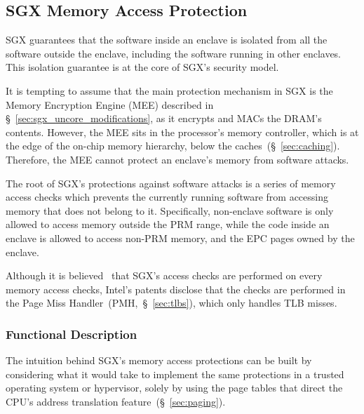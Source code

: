 \subsection{SGX Memory Access Protection}
\label{sec:sgx_access_protection}

SGX guarantees that the software inside an enclave is isolated from all the
software outside the enclave, including the software running in other enclaves.
This isolation guarantee is at the core of SGX's security model.

It is tempting to assume that the main protection mechanism in SGX is the
Memory Encryption Engine (MEE) described in
\S~\ref{sec:sgx_uncore_modifications}, as it encrypts and MACs the DRAM's
contents. However, the MEE sits in the processor's memory controller, which is
at the edge of the on-chip memory hierarchy, below the
caches~(\S~\ref{sec:caching}). Therefore, the MEE cannot protect an enclave's
memory from software attacks.


The root of SGX's protections against software attacks is a series of memory
access checks which prevents the currently running software from accessing
memory that does not belong to it. Specifically, non-enclave software is only
allowed to access memory outside the PRM range, while the code inside an
enclave is allowed to access non-PRM memory, and the EPC pages owned by the
enclave.


Although it is believed~\cite{evtyushkin2014isox} that SGX's access checks are
performed on every memory access checks, Intel's patents disclose that the
checks are performed in the Page Miss Handler~(PMH,~\S~\ref{sec:tlbs}), which
only handles TLB misses.


\subsubsection{Functional Description}
\label{sec:sgx_access_concepts}

The intuition behind SGX's memory access protections can be built by
considering what it would take to implement the same protections in a trusted
operating system or hypervisor, solely by using the page tables that direct the
CPU's address translation feature~(\S~\ref{sec:paging}).

